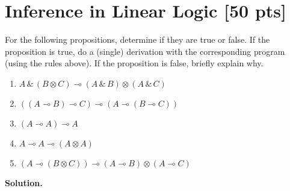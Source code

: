 \documentclass{article}
\newcommand{\with}{\,\&\,}
\newcommand{\tensor}{\otimes}
\newcommand{\lolli}{\multimap}
\newenvironment{solution}{\textbf{Solution.}}{}
\begin{document}
\section{Inference in Linear Logic [50 pts]}
For the following propositions, determine if they are true or false.
If the proposition is true, do a (single) derivation with the corresponding program
(using the rules above).
If the proposition is false, briefly explain why.

\begin{enumerate}
  \item $A \with (B \tensor C) \lolli (A \with B) \tensor (A \with C)$
  \item $((A \lolli B) \lolli C) \lolli (A \lolli (B \lolli C))$
  \item $(A \lolli A) \lolli A$
  \item $A \lolli A \lolli (A \tensor A)$
  \item $(A \lolli (B \tensor C)) \lolli (A \lolli B) \tensor (A \lolli C)$
\end{enumerate}

\begin{solution}
  
\end{solution}
\end{document}
